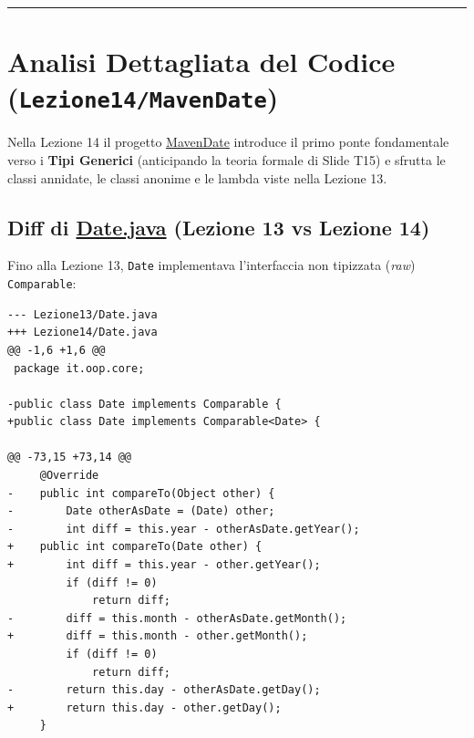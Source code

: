 \documentclass[11pt,a4paper,oneside]{report}
\newcommand{\passthrough}[1]{#1}
\begin{document}
\begin{center}\rule{0.5\linewidth}{0.5pt}\end{center}

\section{\texorpdfstring{Analisi Dettagliata del Codice
(\texttt{Lezione14/MavenDate})}{Analisi Dettagliata del Codice (Lezione14/MavenDate)}}\label{chap13_analisi-dettagliata-del-codice-lezione14mavendate}

Nella Lezione 14 il progetto
\href{file:///home/wally/Documenti/GitHub/Programmazione-II/25-26/Teoria-e-Esercitazioni/Codice-20260902/Lezione14/MavenDate}{MavenDate}
introduce il primo ponte fondamentale verso i \textbf{Tipi Generici}
(anticipando la teoria formale di Slide T15) e sfrutta le classi
annidate, le classi anonime e le lambda viste nella Lezione 13.

\subsection{\texorpdfstring{Diff di
\href{file:///home/wally/Documenti/GitHub/Programmazione-II/25-26/Teoria-e-Esercitazioni/Codice-20260902/Lezione14/MavenDate/src/main/java/it/oop/core/Date.java\#L1-L80}{Date.java}
(Lezione 13 vs Lezione
14)}{Diff di Date.java (Lezione 13 vs Lezione 14)}}\label{chap13_diff-di-date.java-lezione-13-vs-lezione-14}

Fino alla Lezione 13, \passthrough{\lstinline!Date!} implementava
l'interfaccia non tipizzata (\emph{raw})
\passthrough{\lstinline!Comparable!}:

\begin{lstlisting}
--- Lezione13/Date.java
+++ Lezione14/Date.java
@@ -1,6 +1,6 @@
 package it.oop.core;
 
-public class Date implements Comparable {
+public class Date implements Comparable<Date> {
 
@@ -73,15 +73,14 @@
     @Override
-    public int compareTo(Object other) {
-        Date otherAsDate = (Date) other;
-        int diff = this.year - otherAsDate.getYear();
+    public int compareTo(Date other) {
+        int diff = this.year - other.getYear();
         if (diff != 0)
             return diff;
-        diff = this.month - otherAsDate.getMonth();
+        diff = this.month - other.getMonth();
         if (diff != 0)
             return diff;
-        return this.day - otherAsDate.getDay();
+        return this.day - other.getDay();
     }
\end{lstlisting}
\end{document}
